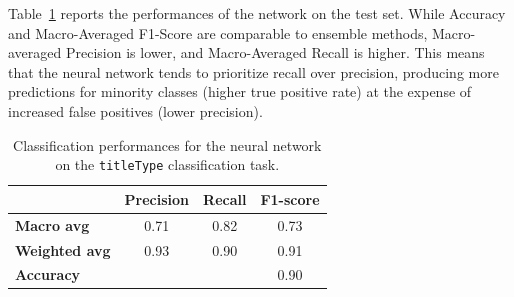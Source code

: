 Table~\ref{tab:nn_report_titletype} reports the performances of
the network on the test set. While Accuracy and Macro-Averaged
F1-Score are comparable to ensemble methods, Macro-averaged
Precision is lower, and Macro-Averaged Recall is higher.
This means that the neural network tends to prioritize recall
over precision, producing more predictions for minority classes
(higher true positive rate) at the expense of increased false
positives (lower precision).

\begin{table}[H]
    \centering
    \begin{tabular}{lccc}
    \hline
     & \textbf{Precision} & \textbf{Recall} & \textbf{F1-score}\\
    \hline
    \textbf{Macro avg}   & 0.71 & 0.82 & 0.73 \\
    \textbf{Weighted avg}& 0.93 & 0.90 & 0.91 \\
    \hline
    \textbf{Accuracy}    & & & 0.90 \\
    \hline
    \end{tabular}
    \caption{Classification performances for the neural network on the \texttt{titleType} classification task.}
    \label{tab:nn_report_titletype}
\end{table}



